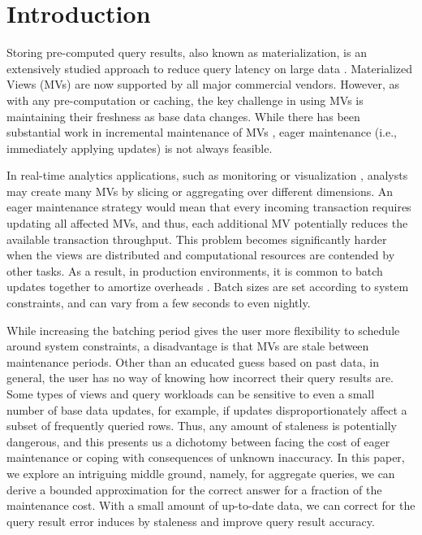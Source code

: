 \vspace{-0.5em}
\section{Introduction}
Storing pre-computed query results, also known as materialization, is an extensively studied approach to reduce query latency on large data \cite{LarsonY85, gupta1995maintenance, chirkova2011materialized}. 
Materialized Views (MVs) are now supported by all major commercial vendors.
However, as with any pre-computation or caching, the key challenge in using MVs is maintaining their freshness as base data changes.
While there has been substantial work in incremental maintenance of MVs \cite{chirkova2011materialized, DBLP:journals/vldb/KochAKNNLS14}, eager maintenance (i.e., immediately applying updates) is not always feasible.

In real-time analytics applications, such as monitoring or visualization \cite{rainbird, DBLP:journals/cgf/LiuJH13}, analysts may create many MVs by slicing or aggregating over different dimensions.
An eager maintenance strategy would mean that every incoming transaction requires updating all affected MVs, and thus, each additional MV potentially reduces the available transaction throughput.
This problem becomes significantly harder when the views are distributed and computational resources are contended by other tasks.
As a result, in production environments, it is common to batch updates together to amortize overheads \cite{chirkova2011materialized}.
Batch sizes are set according to system constraints, and can vary from a few seconds to even nightly.  

While increasing the batching period gives the user more flexibility to schedule around system constraints, a disadvantage is that MVs are stale between maintenance periods.
Other than an educated guess based on past data, in general, the user has no way of knowing how incorrect their query results are.
Some types of views and query workloads can be sensitive to even a small number of base data updates, for example, if updates disproportionately affect a subset of frequently queried rows.
Thus, any amount of staleness is potentially dangerous, and this presents us a dichotomy between facing the cost of eager maintenance or coping with consequences of unknown inaccuracy.
In this paper, we explore an intriguing middle ground, namely, for aggregate queries, we can derive a bounded approximation for the correct answer for a fraction of the maintenance cost.
With a small amount of up-to-date data, we can correct for the query result error induces by staleness and improve query result accuracy.


